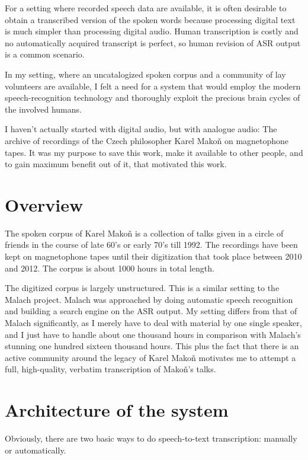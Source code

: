 \documentclass[12pt,a4paper]{report}
\begin{document}
For a setting where recorded speech data are available, it is often desirable to
obtain a transcribed version of the spoken words because processing digital text
is much simpler than processing digital audio. Human transcription is costly and
no automatically acquired transcript is perfect, so human revision of ASR
output is a common scenario.

In my setting, where an uncatalogized spoken corpus and a community of lay
volunteers are available, I felt a need for a system that would employ the
modern speech-recognition technology and thoroughly exploit the precious brain
cycles of the involved humans.

I haven't actually started with digital audio, but with analogue audio: The
archive of recordings of the Czech philosopher Karel Makoň on magnetophone
tapes. It was my purpose to save this work, make it available to other people,
and to gain maximum benefit out of it, that motivated this work.

\section{Overview}

The spoken corpus of Karel Mako\v{n} is a collection of talks given in a circle
of friends in the course of late 60's or early 70's till 1992. The recordings
have been kept on magnetophone tapes until their digitization that took place
between 2010 and 2012. The corpus is about 1000 hours in total length.

The digitized corpus is largely unstructured. 
This is a similar setting to the Malach\cite{psutka2005automatic} project. Malach was
approached by doing automatic speech recognition and building a search engine on
the ASR output. My setting differs from that of Malach significantly, as I
merely have to deal with material by one single speaker, and I just have to handle about one thousand hours
in comparison with Malach's stunning one hundred sixteen thousand hours. This
plus the fact that there is an active community around the legacy of Karel
Mako\v{n} motivates me to attempt a full, high-quality, verbatim transcription
of Mako\v{n}'s talks.

\section{Architecture of the system}

Obviously, there are two basic ways to do speech-to-text transcription:
manually or
automatically.
\end{document}
